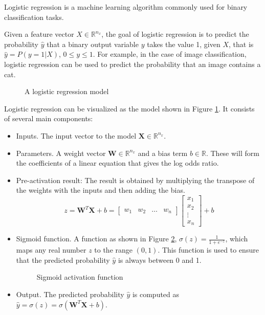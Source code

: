 		
		Logistic regression\cite{geron2022hands} is a machine learning algorithm commonly used for binary classification tasks.
		
		Given a feature vector $X \in \mathbb{R}^{n_x}$, the goal of logistic regression is to predict the probability $\hat{y}$ that a binary output variable $y$ takes the value 1, given $X$, that is $\hat{y} = P(y=1|X)$, $0\le y\le1$. 
		For example, in the case of image classification, logistic regression can be used to predict the probability that an image contains a cat.
		
		\begin{figure}[H]
			\centering
			
			\caption{A logistic regression model}
			\label{fig:logisticregression}
		\end{figure}
		
		
		Logistic regression can be visualized as the model shown in Figure \ref{fig:logisticregression}. It consists of several main components:
		
		\begin{itemize}[]
			\item Inputs. The input vector to the model $\textbf{X} \in \mathbb{R}^{n_x}$.
			
			\item Parameters. A weight vector $\textbf{W} \in \mathbb{R}^{n_x}$ and a bias term $b \in \mathbb{R}$.  These will form the coefficients of a linear equation that gives the log odds ratio.
			
			\item Pre-activation result: The result is obtained by multiplying the transpose of the weights with the inputs and then adding the bias. 
			\begin{equation}
				z = \textbf{W}^{T}\textbf{X} + b = 
				\begin{bmatrix} 
					w_1 & w_2 & \dots & w_n
				\end{bmatrix}
				\begin{bmatrix} 
					x_1 \\ 
					x_2 \\ 
					\vdots \\ 
					x_n
				\end{bmatrix} + b
			\end{equation}

			
			
			\item Sigmoid function. A function as shown in Figure \ref{fig:sigmoid}, $\sigma(z) = \frac{1}{1 + e^{-z}}$, which maps any real number $z$ to the range $(0,1)$. This function is used to ensure that the predicted probability $\hat{y}$ is always between 0 and 1.
			
			\begin{figure}[H]
				\centering
				
				\caption{Sigmoid activation function}
				\label{fig:sigmoid}
			\end{figure}
			
			\item Output. The predicted probability $\hat{y}$ is computed as $\hat{y} = \sigma(z) = \sigma(\textbf{W}^{T}\textbf{X} + b)$.
		\end{itemize}
		\bigskip
		
